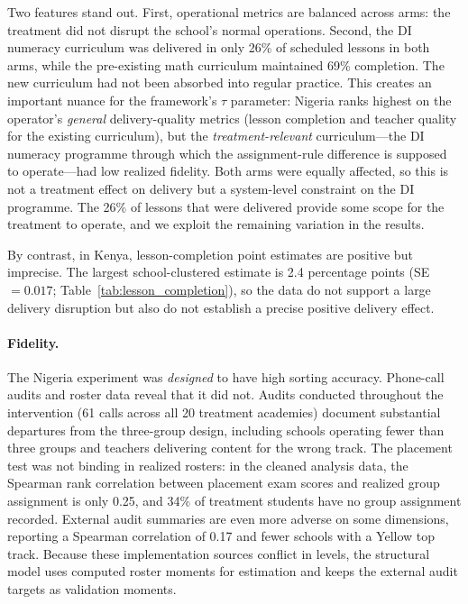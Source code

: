 \documentclass[11pt]{article}
\begin{document}
Two features stand out. First, operational metrics are balanced across arms: the treatment did not disrupt the school's normal operations. Second, the DI numeracy curriculum was delivered in only 26\% of scheduled lessons in both arms, while the pre-existing math curriculum maintained 69\% completion. The new curriculum had not been absorbed into regular practice. This creates an important nuance for the framework's $\tau$ parameter: Nigeria ranks highest on the operator's \emph{general} delivery-quality metrics (lesson completion and teacher quality for the existing curriculum), but the \emph{treatment-relevant} curriculum---the DI numeracy programme through which the assignment-rule difference is supposed to operate---had low realized fidelity. Both arms were equally affected, so this is not a treatment effect on delivery but a system-level constraint on the DI programme. The 26\% of lessons that were delivered provide some scope for the treatment to operate, and we exploit the remaining variation in the results.

By contrast, in Kenya, lesson-completion point estimates are positive but imprecise. The largest school-clustered estimate is 2.4 percentage points (SE $=0.017$; Table~\ref{tab:lesson_completion}), so the data do not support a large delivery disruption but also do not establish a precise positive delivery effect.

\paragraph{Fidelity.} The Nigeria experiment was \emph{designed} to have high sorting accuracy. Phone-call audits and roster data reveal that it did not. Audits conducted throughout the intervention (61 calls across all 20 treatment academies) document substantial departures from the three-group design, including schools operating fewer than three groups and teachers delivering content for the wrong track. The placement test was not binding in realized rosters: in the cleaned analysis data, the Spearman rank correlation between placement exam scores and realized group assignment is only 0.25, and 34\% of treatment students have no group assignment recorded. External audit summaries are even more adverse on some dimensions, reporting a Spearman correlation of 0.17 and fewer schools with a Yellow top track. Because these implementation sources conflict in levels, the structural model uses computed roster moments for estimation and keeps the external audit targets as validation moments.
\end{document}
